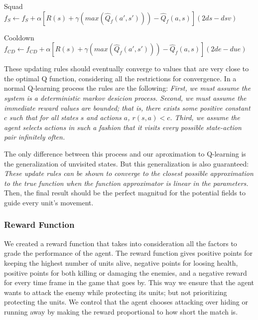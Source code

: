 \begin{flushleft}
Squad  \\ 
$f_{S}  \leftarrow f_{S}  + \alpha [ R(s) + \gamma (max(\hat{Q}_{f} (a',s')))-\hat{Q}_{f} (a,s) ] (2ds - dsv)$
\end{flushleft} 

\begin{flushleft}
Cooldown  \\ 
$f_{CD}  \leftarrow f_{CD}  + \alpha [ R(s) + \gamma (max(\hat{Q}_{f} (a',s')))-\hat{Q}_{f} (a,s) ](2de - due)$ 
\end{flushleft} 

These updating rules should eventually converge to values that are very close to the optimal Q function, considering all the restrictions for convergence. In a normal Q-learning process the rules are the following: \textit{First, we must assume the system is a deterministic markov desicion process. Second, we must assume the immediate reward values are bounded; that is, there exists some positive constant $c$ such that for all states $s$ and actions $a$, $r(s,a) < c$. Third, we assume the agent selects actions in such a fashion that it visits every possible state-action pair infinitely often.} \cite[p377]{ml_tom_mitchel} 

The only difference between this process and our aproximation to Q-learning is the generalization of unvisited states. But this generalization is also guaranteed: \textit{These update rules can be shown to converge to the closest possible approximation to the true function when the function approximator is linear in the parameters. }\cite[p779]{rl} Then, the final result should be the perfect magnitud for the potential fields to guide every unit's movement.


\subsubsection{Reward Function}

We created a reward function that takes into consideration all the factors to grade the performance of the agent. The reward function gives positive points for keeping the highest number of units alive, negative points for loosing health, positive points for both killing or damaging the enemies, and a negative reward for every time frame in the game that goes by. This way we ensure that the agent wants to attack the enemy while protecting its units; but not prioritizing protecting the units. We control that the agent chooses attacking over hiding or running away by making the reward proportional to how short the match is. \\ 

